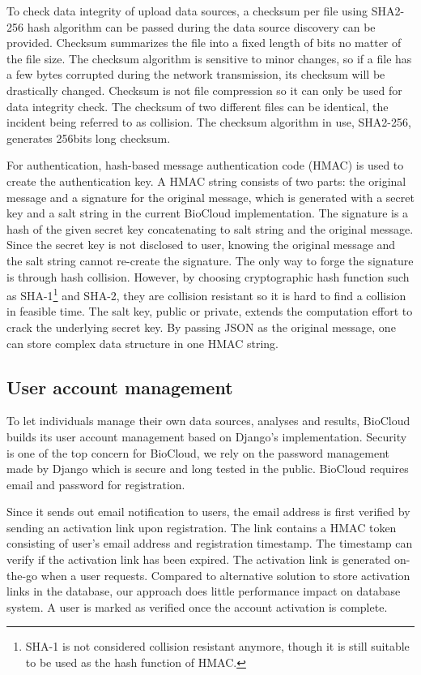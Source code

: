 To check data integrity of upload data sources, a checksum per file using
SHA2-256 hash algorithm can be passed during the data source discovery can be
provided. Checksum summarizes the file into a fixed length of bits no matter of
the file size. The checksum algorithm is sensitive to minor changes, so if a
file has a few bytes corrupted during the network transmission, its checksum
will be drastically changed. Checksum is not file compression so it can only be
used for data integrity check. The checksum of two different files can be
identical, the incident being referred to as collision. The checksum algorithm
in use, SHA2-256, generates 256bits long checksum.

For authentication, hash-based message authentication code (HMAC) is used to
create the authentication key. A HMAC string consists of two parts: the
original message and a signature for the original message, which is generated
with a secret key and a salt string in the current BioCloud implementation. The
signature is a hash of the given secret key concatenating to salt string and
the original message. Since the secret key is not disclosed to user, knowing
the original message and the salt string cannot re-create the signature. The
only way to forge the signature is through hash collision. However, by
choosing cryptographic hash function such as SHA-1\footnote{
    SHA-1 is not considered collision resistant anymore, though it is still
    suitable to be used as the hash function of HMAC.
} and SHA-2, they are collision resistant so it is hard to find a collision in
feasible time. The salt key, public or private, extends the computation effort
to crack the underlying secret key. By passing JSON as the original message,
one can store complex data structure in one HMAC string.


\subsection{User account management}

To let individuals manage their own data sources, analyses and results,
BioCloud builds its user account management based on Django's implementation.
Security is one of the top concern for BioCloud, we rely on the password
management made by Django which is secure and long tested in the public.
BioCloud requires email and password for registration.

Since it sends out email notification to users, the email address is first
verified by sending an activation link upon registration. The link contains a
HMAC token consisting of user's email address and registration timestamp. The
timestamp can verify if the activation link has been expired. The activation
link is generated on-the-go when a user requests. Compared to alternative
solution to store activation links in the database, our approach does little
performance impact on database system. A user is marked as verified once the
account activation is complete.

